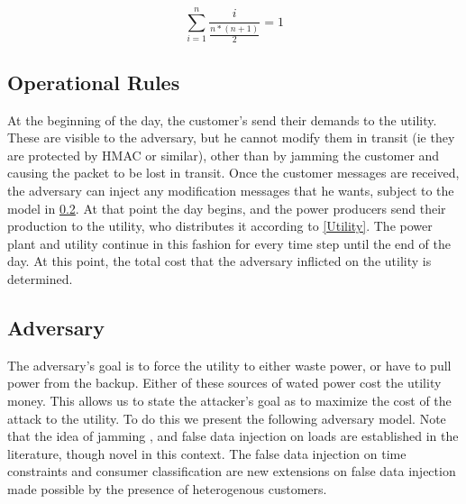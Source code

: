 \documentclass[conference]{IEEEtran}
\begin{document}
\begin{equation}
\label{probability}
\sum\limits_{i=1}^n \frac{i}{\frac{n*(n+1)}{2}} = 1
\end{equation}

\subsection{Operational Rules}
\label{Rules}

At the beginning of the day, the customer's send their demands to the utility. These are visible to the adversary, but he cannot modify them in transit (ie they are protected by HMAC or similar), other than by jamming the customer and causing the packet to be lost in transit.   Once the customer messages are received, the adversary can inject any modification messages that he wants, subject to the model in \ref{Adversary}. At that point the day begins, and the power producers send their production to the utility, who distributes it according to \ref{Utility}. The power plant and utility continue in this fashion for every time step until the end of the day. At this point, the total cost that the adversary inflicted
on the utility is determined.

\subsection{Adversary}
\label{Adversary}

The adversary's goal is to force the utility to either waste power, or have to pull power from the backup. Either of these sources of wated power cost the utility money. This allows us to state the attacker's goal as to maximize the cost of the attack to the utility. To do this we present the following adversary model. Note that the idea of jamming \cite{gupta2010optimal}, and false data injection on loads \cite{lin2012false}\cite{yuan2011modeling} are established in the literature, though novel in this context. The false data injection on time constraints and consumer classification are new extensions on false data injection made possible by the presence of heterogenous customers.
\end{document}
